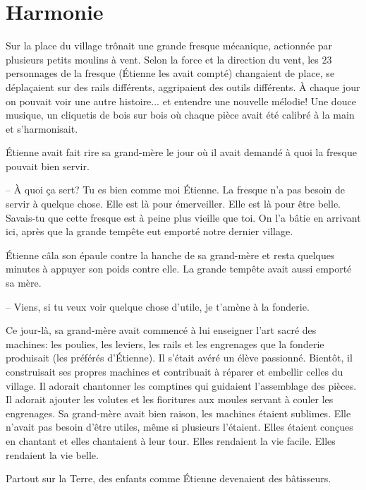 \chapter{Harmonie}

Sur la place du village trônait une grande fresque mécanique, actionnée par
plusieurs petits moulins à vent.
%
Selon la force et la direction du vent, les 23 personnages de la fresque
(Étienne les avait compté) changaient de place, se déplaçaient sur des rails
différents, aggripaient des outils différents.  
%
À chaque jour on pouvait voir une autre histoire... et entendre une nouvelle
mélodie!  
%
Une douce musique, un cliquetis de bois sur bois où chaque pièce
avait été calibré à la main et s'harmonisait.

Étienne avait fait rire sa grand-mère le jour où il avait demandé à quoi la
fresque pouvait bien servir.

-- À quoi ça sert? Tu es bien comme moi Étienne. La fresque n'a pas besoin de
servir à quelque chose. Elle est là pour émerveiller. Elle est là pour être
belle. Savais-tu que cette fresque est à peine plus vieille que toi. On l'a
bâtie en arrivant ici, après que la grande tempête eut emporté 
notre dernier village.

Étienne câla son épaule contre la hanche de sa grand-mère
et resta quelques minutes à appuyer son poids contre elle.
%
La grande tempête avait aussi emporté sa mère.

-- Viens, si tu veux voir quelque chose d'utile, je t'amène à la fonderie.

Ce jour-là, sa grand-mère avait commencé à lui enseigner l'art sacré des
machines: les poulies, les leviers, les rails et les
engrenages que la fonderie produisait (les préférés d'Étienne).
%
Il s'était avéré un élève passionné.
%
Bientôt, il construisait ses propres machines et contribuait à réparer et
embellir celles du village.  
%
Il adorait chantonner les comptines qui guidaient
l'assemblage des pièces.  
%
Il adorait ajouter les volutes et les fioritures aux
moules servant à couler les engrenages. 
%
Sa grand-mère avait bien raison,
les machines étaient sublimes.  
%
Elle n'avait pas besoin d'être utiles, même si
plusieurs l'étaient.  
%
Elles étaient conçues en chantant et elles chantaient à leur tour.  
%
Elles rendaient la vie facile. 
%
Elles rendaient la
vie belle.

Partout sur la Terre, des enfants comme Étienne devenaient des bâtisseurs.

\sautSection{}

